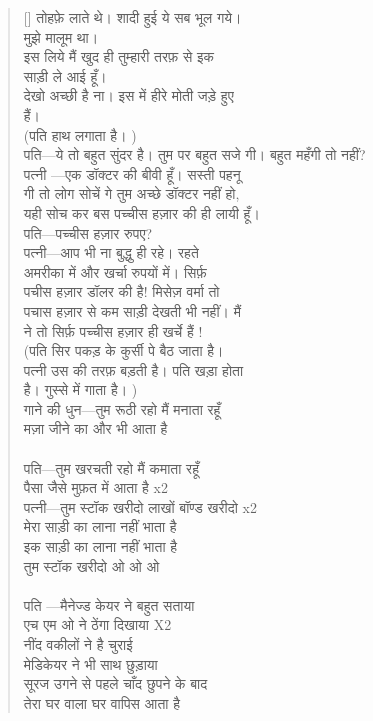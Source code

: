 \begin{verse}[\versewidth]
{तोहफ़े लाते थे। शादी हुई ये सब भूल गये।\\
मुझे मालूम था।\\
इस लिये मैं खुद ही तुम्हारी तरफ़ से इक\\
साड़ी ले आई हूँ।\\
देखो अच्छी है ना। इस में हीरे मोती जड़े हुए\\
हैं।\\
(पति हाथ लगाता है।
)\\
पति—ये तो बहुत सुंदर है। तुम पर बहुत सजे गी। बहुत महँगी तो नहीं?\\
पत्नी —एक डॉक्टर की बीवी हूँ। सस्ती पहनू \\
गी तो लोग सोचें गे तुम अच्छे डॉक्टर नहीं हो,\\
यही सोच कर बस पच्चीस हज़ार की ही लायी हूँ।\\
पति—पच्चीस हज़ार रुपए?\\
पत्नी—आप भी ना बुद्धु ही रहे। रहते \\
अमरीका में और खर्चा रुपयों में। सिर्फ़ \\
पचीस हज़ार डॉलर की है! मिसेज़ वर्मा तो \\
पचास हज़ार से कम साड़ी देखती भी नहीं। मैं \\
ने तो सिर्फ़ पच्चीस हज़ार ही खर्चे हैं !\\
(पति सिर पकड़ के कुर्सी पे बैठ जाता है।\\
पत्नी उस की तरफ़ बड़ती है। पति खड़ा होता\\
है। गुस्से में गाता है।
) \\
गाने की धुन—तुम रूठी रहो मैं मनाता रहूँ\\
मज़ा जीने का और भी आता है\\
\\
पति—तुम खरचती रहो मैं कमाता रहूँ\\
पैसा जैसे मुफ़त में आता है
}x\texthindi{2\\
पत्नी—तुम स्टॉक खरीदो लाखों बॉण्ड खरीदो x2 \\
मेरा साड़ी का लाना नहीं भाता है\\
इक साड़ी का लाना नहीं भाता है\\
तुम स्टॉक खरीदो ओ ओ ओ\\
\\
पति —मैनेज्ड केयर ने बहुत सताया\\
एच एम ओ ने ठेंगा दिखाया X2\\
नींद वकीलों ने है चुराई\\
मेडिकेयर ने भी साथ छुड़ाया\\
सूरज उगने से पहले चाँद छुपने के बाद\\
तेरा घर वाला घर वापिस आता है\\
}
\end{verse}

